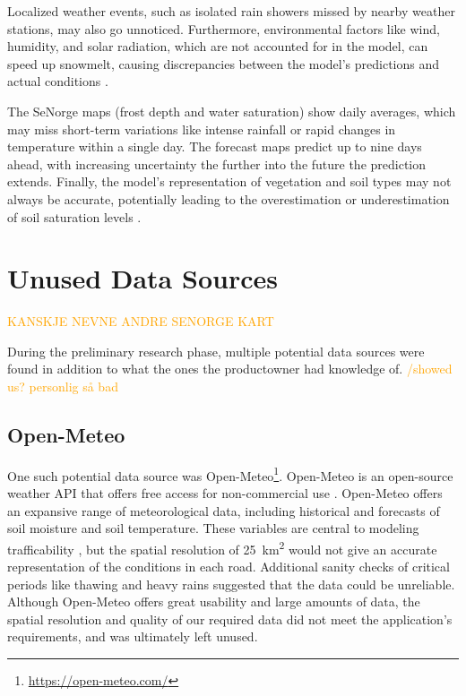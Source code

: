 Localized weather events, such as isolated rain showers missed by nearby weather stations, may also go unnoticed. Furthermore, environmental factors like wind, humidity, and solar radiation, which are not accounted for in the model, can speed up snowmelt, causing discrepancies between the model's predictions and actual conditions \cite{senorge_watermap}.

The SeNorge maps (frost depth and water saturation) show daily averages, which may miss short-term variations like intense rainfall or rapid changes in temperature within a single day. The forecast maps predict up to nine days ahead, with increasing uncertainty the further into the future the prediction extends. Finally, the model's representation of vegetation and soil types may not always be accurate, potentially leading to the overestimation or underestimation of soil saturation levels \cite{senorge_watermap}.

\section{Unused Data Sources}\label{sec:unuseddatasources}

\textcolor{orange}{KANSKJE NEVNE ANDRE SENORGE KART}

During the preliminary research phase, multiple potential data sources were found in addition to what the ones the \gls{productowner} had knowledge of. \textcolor{orange}{/showed us? personlig så bad}

\subsection{Open-Meteo}

One such potential data source was Open-Meteo\footnote{\url{https://open-meteo.com/}}. Open-Meteo is an open-source weather API that offers free access for non-commercial use \cite{openmeteo}. Open-Meteo offers an expansive range of meteorological data, including historical and forecasts of soil moisture and soil temperature. These variables are central to modeling trafficability \cite{fjeld2023trafficability}, but the spatial resolution of \qty{25}{\kilo\meter\squared} would not give an accurate representation of the conditions in each road. Additional sanity checks of critical periods like thawing and heavy rains suggested that the data could be unreliable. Although Open-Meteo offers great usability and large amounts of data, the spatial resolution and quality of our required data did not meet the application's requirements, and was ultimately left unused. 

